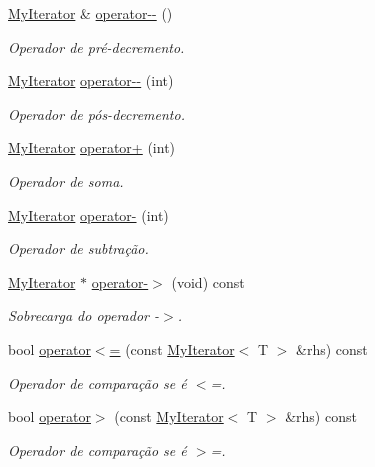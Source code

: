 \begin{DoxyCompactItemize}
\hyperlink{classsc_1_1MyIterator}{My\+Iterator} \& \hyperlink{classsc_1_1MyIterator_a6f96be4dbb7b53cc4e6a39f977a9babb}{operator-\/-\/} ()
\begin{DoxyCompactList}\small\item\em Operador de pré-\/decremento. \end{DoxyCompactList}\item 
\hyperlink{classsc_1_1MyIterator}{My\+Iterator} \hyperlink{classsc_1_1MyIterator_a5b8ef57da66d65e8e95a1ae01cc79252}{operator-\/-\/} (int)
\begin{DoxyCompactList}\small\item\em Operador de pós-\/decremento. \end{DoxyCompactList}\item 
\hyperlink{classsc_1_1MyIterator}{My\+Iterator} \hyperlink{classsc_1_1MyIterator_a493264c7561ef545b06d47c0b5835d59}{operator+} (int)
\begin{DoxyCompactList}\small\item\em Operador de soma. \end{DoxyCompactList}\item 
\hyperlink{classsc_1_1MyIterator}{My\+Iterator} \hyperlink{classsc_1_1MyIterator_a8e2ffa4f2a06d9377238bccb8954b2c0}{operator-\/} (int)
\begin{DoxyCompactList}\small\item\em Operador de subtração. \end{DoxyCompactList}\item 
\hyperlink{classsc_1_1MyIterator}{My\+Iterator} $\ast$ \hyperlink{classsc_1_1MyIterator_a5d82243284e5b50a286e9b45b4566623}{operator-\/$>$} (void) const
\begin{DoxyCompactList}\small\item\em Sobrecarga do operador -\/$>$. \end{DoxyCompactList}\item 
bool \hyperlink{classsc_1_1MyIterator_ad8c2b40a518b2f112784f8fb2fe3e8fe}{operator$<$=} (const \hyperlink{classsc_1_1MyIterator}{My\+Iterator}$<$ T $>$ \&rhs) const
\begin{DoxyCompactList}\small\item\em Operador de comparação se é $<$=. \end{DoxyCompactList}\item 
bool \hyperlink{classsc_1_1MyIterator_ab8ca63fa245d05aebc771422c7861dc7}{operator$>$} (const \hyperlink{classsc_1_1MyIterator}{My\+Iterator}$<$ T $>$ \&rhs) const
\begin{DoxyCompactList}\small\item\em Operador de comparação se é $>$=. \end{DoxyCompactList}\item 

\end{DoxyCompactItemize}
